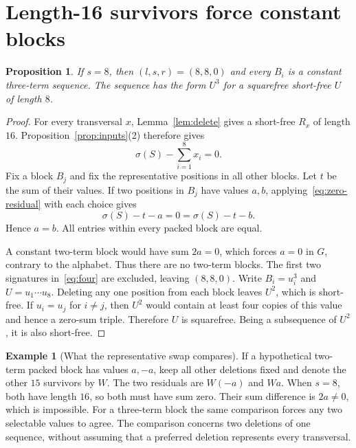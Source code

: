 \documentclass[11pt]{article}
\newtheorem{proposition}[theorem]{Proposition}
\theoremstyle{definition}
\newtheorem{example}[theorem]{Example}
\theoremstyle{remark}
\newcommand{\sig}{\sigma}
\begin{document}
\section{Length-16 survivors force constant blocks}\label{sec:eight}
\begin{proposition}\label{prop:eight}
If $s=8$, then $(l,s,r)=(8,8,0)$ and every $B_i$ is a constant
three-term sequence. The sequence has the form $U^3$ for a squarefree
short-free $U$ of length $8$.
\end{proposition}
\begin{proof}
For every transversal $x$, Lemma~\ref{lem:delete} gives a short-free
$R_x$ of length $16$. Proposition~\ref{prop:inputs}(2) therefore gives
\begin{equation}\label{eq:zero-residual}
                  \sig(S)-\sum_{i=1}^8x_i=0.
\end{equation}
Fix a block $B_j$ and fix the representative positions in all other
blocks. Let $t$ be the sum of their values. If two positions in $B_j$
have values $a,b$, applying~\eqref{eq:zero-residual} with each choice gives
\[
               \sig(S)-t-a=0=\sig(S)-t-b.
\]
Hence $a=b$. All entries within every packed block are equal.

A constant two-term block would have sum $2a=0$, which forces $a=0$
in $G$, contrary to the alphabet. Thus there are no two-term blocks.
The first two signatures in~\eqref{eq:four} are excluded, leaving
$(8,8,0)$. Write $B_i=u_i^3$ and $U=u_1\cdots u_8$.
Deleting any one position from each block leaves $U^2$, which is
short-free. If $u_i=u_j$ for $i\neq j$, then $U^2$ would contain at
least four copies of this value and hence a zero-sum triple.
Therefore $U$ is squarefree. Being a subsequence of $U^2$, it is also
short-free.
\end{proof}

\begin{example}[What the representative swap compares]\label{ex:swap}
If a hypothetical two-term packed block has values $a,-a$, keep all
other deletions fixed and denote the other $15$ survivors by $W$.
The two residuals are $W(-a)$ and $Wa$. When $s=8$, both have length
$16$, so both must have sum zero. Their sum difference is $2a\neq0$,
which is impossible. For a three-term block the same comparison forces
any two selectable values to agree. The comparison concerns two
deletions of one sequence, without assuming that a preferred deletion
represents every transversal.
\end{example}
\FloatBarrier
\end{document}
